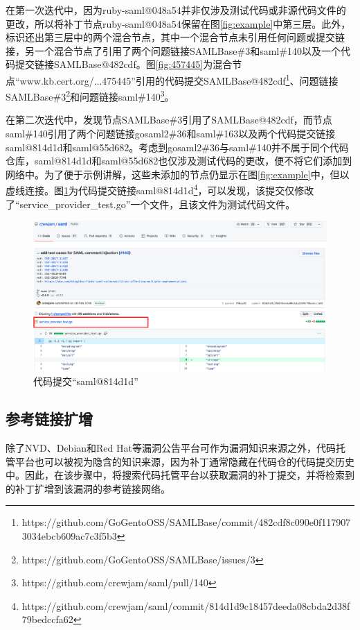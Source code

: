 \begin{exmp}
在第一次迭代中，因为ruby-saml@048a54并非仅涉及测试代码或非源代码文件的更改，所以\tool 将补丁节点ruby-saml@048a54保留在图\ref{fig:example}中第三层。此外，\tool 标识还出第三层中的两个混合节点，其中一个混合节点未引用任何问题或提交链接，另一个混合节点了引用了两个问题链接SAMLBase\#3和saml\#140以及一个代码提交链接SAMLBase@482cdf。图\ref{fig:457445}为混合节点“www.kb.cert.org/...475445”引用的代码提交SAMLBase@482cdf\footnote{https://github.com/GoGentoOSS/SAMLBase/commit/482cdf8c090e0f1179073034ebcb609ac7c3f5b3}、问题链接SAMLBase\#3\footnote{https://github.com/GoGentoOSS/SAMLBase/issues/3}和问题链接saml\#140\footnote{https://github.com/crewjam/saml/pull/140}。

在第二次迭代中，\tool 发现节点SAMLBase\#3引用了SAMLBase@482cdf，而节点saml\#140引用了两个问题链接gosaml2\#36和saml\#163以及两个代码提交链接saml@814d1d和saml@55d682。考虑到gosaml2\#36与saml\#140并不属于同个代码仓库，saml@814d1d和saml@55d682也仅涉及测试代码的更改，\tool 便不将它们添加到网络中。为了便于示例讲解，这些未添加的节点仍显示在图\ref{fig:example}中，但以虚线连接。图\ref{fig:814d1d9}为代码提交链接saml@814d1d\footnote{https://github.com/crewjam/saml/commit/814d1d9c18457deeda08cbda2d38f79bedccfa62}，可以发现，该提交仅修改了“service\_provider\_test.go”一个文件，且该文件为测试代码文件。
\end{exmp}

\begin{figure}[!t]
    \centering
    \includegraphics[scale=0.29]{fig/commit-814d1d9}
    \caption{代码提交“saml@814d1d”}\label{fig:814d1d9}
\end{figure}

\subsection{参考链接扩增}\label{sec:addGithub}
除了NVD、Debian和Red Hat等漏洞公告平台可作为漏洞知识来源之外，代码托管平台也可以被视为隐含的知识来源，因为补丁通常隐藏在代码仓的代码提交历史中。因此，在该步骤中，\tool 将搜索代码托管平台以获取漏洞的补丁提交，并将检索到的补丁扩增到该漏洞的参考链接网络。


